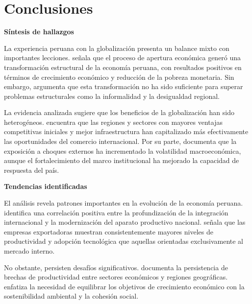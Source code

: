 \documentclass[12pt, a4paper]{article}
\begin{document}
\section{Conclusiones}


\textbf{Síntesis de hallazgos}  

La experiencia peruana con la globalización presenta un balance mixto con importantes lecciones. \textcite{seminario2022balance} señala que el proceso de apertura económica generó una transformación estructural de la economía peruana, con resultados positivos en términos de crecimiento económico y reducción de la pobreza monetaria. Sin embargo, \textcite{paz2021desafios} argumenta que esta transformación no ha sido suficiente para superar problemas estructurales como la informalidad y la desigualdad regional.

La evidencia analizada sugiere que los beneficios de la globalización han sido heterogéneos. \textcite{vega2021disparidades} encuentra que las regiones y sectores con mayores ventajas competitivas iniciales y mejor infraestructura han capitalizado más efectivamente las oportunidades del comercio internacional. Por su parte, \textcite{torres2020vulnerabilidad} documenta que la exposición a choques externos ha incrementado la volatilidad macroeconómica, aunque el fortalecimiento del marco institucional ha mejorado la capacidad de respuesta del país.

\textbf{Tendencias identificadas}  

El análisis revela patrones importantes en la evolución de la economía peruana. \textcite{parodi2021tendencias} identifica una correlación positiva entre la profundización de la integración internacional y la modernización del aparato productivo nacional. \textcite{contreras2022perspectivas} señala que las empresas exportadoras muestran consistentemente mayores niveles de productividad y adopción tecnológica que aquellas orientadas exclusivamente al mercado interno.

No obstante, persisten desafíos significativos. \textcite{jimenez2021brechas} documenta la persistencia de brechas de productividad entre sectores económicos y regiones geográficas. \textcite{gonzales2022sostenibilidad} enfatiza la necesidad de equilibrar los objetivos de crecimiento económico con la sostenibilidad ambiental y la cohesión social.
\newpage
\printbibliography
\end{document}
